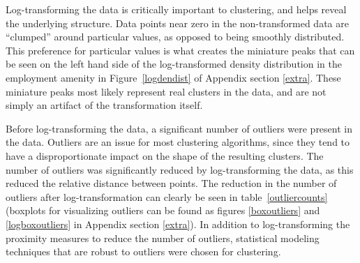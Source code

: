 \documentclass[11pt, a4paper]{article}
\begin{document}
Log-transforming the data is critically important to clustering, and helps reveal the underlying structure. Data points near zero in the non-transformed data are ``clumped'' around particular values, as opposed to being smoothly distributed. This preference for particular values is what creates the miniature peaks that can be seen on the left hand side of the log-transformed density distribution in the employment amenity in Figure~\ref{logdendist} of Appendix section \ref{extra}. These miniature peaks most likely represent real clusters in the data, and are not simply an artifact of the transformation itself. 
\par
Before log-transforming the data, a significant number of outliers were present in the data. Outliers are an issue for most clustering algorithms, since they tend to have a disproportionate impact on the shape of the resulting clusters. The number of outliers was significantly reduced by log-transforming the data, as this reduced the relative distance between points. The reduction in the number of outliers after log-transformation can clearly be seen in table~\ref{outliercounts} (boxplots for visualizing outliers can be found as figures \ref{boxoutliers} and \ref{logboxoutliers} in Appendix section \ref{extra}). In addition to log-transforming the proximity measures to reduce the number of outliers, statistical modeling techniques that are robust to outliers were chosen for clustering.




\begin{table}[h]
\centering
\caption[Number of outliers]{The number of outliers in each amenity in the PMD before and after log-transformation.}\label{outliercounts}
\end{table}
\end{document}
